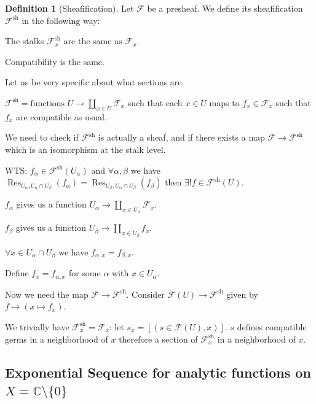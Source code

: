 \documentclass{article}
\theoremstyle{definition}
\newtheorem*{definition}{Definition}
\begin{document}
    \begin{definition}
        [Sheafification] Let \(\mathcal{F}\) be a presheaf. We define its sheafification \(\mathcal{F} ^{\operatorname{sh}}\) in the following way:

        The stalks \(\mathcal{F}_x^{\operatorname{sh}}\) are the same as \(\mathcal{F}_x\).

        Compatibility is the same.

        Let us be very specific about what sections are.

        \(\mathcal{F}^{\operatorname{sh}} = \text{functions } U \to \coprod_{x\in U} \mathcal{F}_x\) such that each \(x\in U\) maps to \(f_x\in \mathcal{F}_x\) such that \(f_x\) are compatible as usual. 
    \end{definition}

    We need to check if \(\mathcal{F}^{\operatorname{sh}}\) is actually a sheaf, and if there exists a map \(\mathcal{F} \to \mathcal{F}^{\operatorname{sh}}\) which is an isomorphism at the stalk level.

    WTS: \(f_\alpha \in \mathcal{F}^{\operatorname{sh}}(U_\alpha)\) and \(\forall \alpha ,\beta\) we have \(\operatorname{Res}_{U_\alpha , U_\alpha \cap U_\beta} (f_\alpha) = \operatorname{Res}_{U_\beta , U_\alpha \cap U_\beta}(f_\beta)\) then \(\exists ! f \in \mathcal{F}^{\operatorname{sh}}(U)\).

    \(f_\alpha\) gives us a function \(U_\alpha \to \coprod_{x\in U_\alpha} \mathcal{F}_x\).
    
    \(f_\beta\) gives us a function \(U_\beta \to \coprod_{x\in U_\beta} f_x\).

    \(\forall x\in U_\alpha \cap U_\beta\) we have \(f_{\alpha, x} = f_{\beta , x}\).

    Define \(f_x = f_{\alpha , x}\) for some \(\alpha\) with \(x\in U_\alpha\).

    Now we need the map \(\mathcal{F} \to \mathcal{F}^{\operatorname{sh}}\). Consider \(\mathcal{F}(U) \to \mathcal{F}^{\operatorname{sh}}\) given by \(f \mapsto (x \mapsto f_x)\).
    
    We trivially have \(\mathcal{F}_x^{\operatorname{sh}} = \mathcal{F}_x\): let \(s_x = [(s\in \mathcal{F}(U), x)]\). \(s\) defines compatible germs in a neighborhood of \(x\) therefore a section of \(\mathcal{F}_x^{\operatorname{sh}}\) in a neighborhood of \(x\).

    \subsection*{Exponential Sequence for analytic functions on \(X = \mathbb{C} \setminus \{ 0 \}\)}
\end{document}
